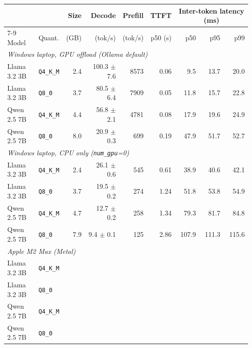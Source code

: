 \begin{tabular}{llrrrrrrr}
\toprule
 & & Size & Decode & Prefill & TTFT & \multicolumn{3}{c}{Inter-token latency (ms)} \\
\cmidrule(lr){7-9}
Model & Quant. & (GB) & (tok/s) & (tok/s) & p50 (s) & p50 & p95 & p99 \\
\midrule
\multicolumn{9}{l}{\textit{Windows laptop, GPU offload (Ollama default)}} \\
Llama 3.2 3B & \texttt{Q4\_K\_M} & 2.4 & 100.3 $\pm$ 7.6 & 8573 & 0.06 & 9.5 & 13.7 & 20.0 \\
Llama 3.2 3B & \texttt{Q8\_0} & 3.7 & 80.5 $\pm$ 6.4 & 7909 & 0.05 & 11.8 & 15.7 & 22.8 \\
Qwen 2.5 7B & \texttt{Q4\_K\_M} & 4.4 & 56.8 $\pm$ 2.1 & 4781 & 0.08 & 17.9 & 19.6 & 24.9 \\
Qwen 2.5 7B & \texttt{Q8\_0} & 8.0 & 20.9 $\pm$ 0.3 & 699 & 0.19 & 47.9 & 51.7 & 52.7 \\
\midrule
\multicolumn{9}{l}{\textit{Windows laptop, CPU only (\texttt{num\_gpu}=0)}} \\
Llama 3.2 3B & \texttt{Q4\_K\_M} & 2.4 & 26.1 $\pm$ 0.6 & 545 & 0.61 & 38.9 & 40.6 & 42.1 \\
Llama 3.2 3B & \texttt{Q8\_0} & 3.7 & 19.5 $\pm$ 0.2 & 274 & 1.24 & 51.8 & 53.8 & 54.9 \\
Qwen 2.5 7B & \texttt{Q4\_K\_M} & 4.7 & 12.7 $\pm$ 0.2 & 258 & 1.34 & 79.3 & 81.7 & 84.8 \\
Qwen 2.5 7B & \texttt{Q8\_0} & 7.9 & 9.4 $\pm$ 0.1 & 125 & 2.86 & 107.9 & 111.3 & 115.6 \\
\midrule
\multicolumn{9}{l}{\textit{Apple M2 Max (Metal)}} \\
Llama 3.2 3B & \texttt{Q4\_K\_M} & \tbd{} & \tbd{} & \tbd{} & \tbd{} & \tbd{} & \tbd{} & \tbd{} \\
Llama 3.2 3B & \texttt{Q8\_0} & \tbd{} & \tbd{} & \tbd{} & \tbd{} & \tbd{} & \tbd{} & \tbd{} \\
Qwen 2.5 7B & \texttt{Q4\_K\_M} & \tbd{} & \tbd{} & \tbd{} & \tbd{} & \tbd{} & \tbd{} & \tbd{} \\
Qwen 2.5 7B & \texttt{Q8\_0} & \tbd{} & \tbd{} & \tbd{} & \tbd{} & \tbd{} & \tbd{} & \tbd{} \\
\bottomrule
\end{tabular}
